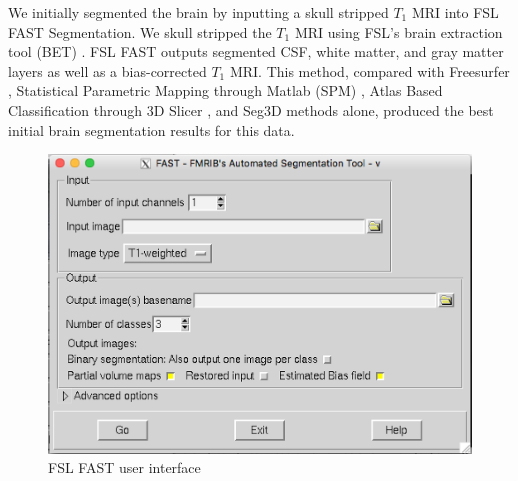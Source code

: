 We initially segmented the brain by inputting a skull stripped $T_1$ MRI into FSL FAST Segmentation. We skull stripped the $T_1$ MRI using FSL's brain extraction tool (BET) \cite{ref:bet1}. FSL FAST outputs segmented CSF, white matter, and gray matter layers as well as a bias-corrected $T_1$ MRI. This method, compared with Freesurfer \cite{ref:freesurf}, Statistical Parametric Mapping through Matlab (SPM) \cite{ref:spm}, Atlas Based Classification through 3D Slicer \cite{ref:abc}, and Seg3D methods alone, produced the best initial brain segmentation results for this data.
\begin{figure}[H]
    \centering
    \includegraphics[width=.8\textwidth]{Figures/FSL_FAST}
    \caption{FSL FAST user interface}
    \label{fig:fslfast}
\end{figure}

